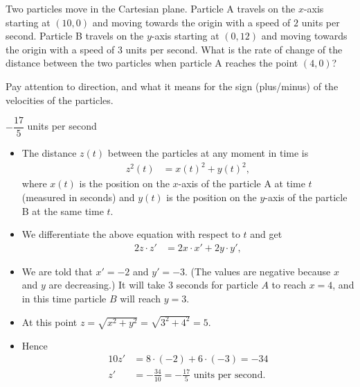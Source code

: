 
\begin{question}[2015Q]\label{s3.2Pythagorusfirst}
Two particles move in the Cartesian plane. Particle A travels on the $x$-axis
starting at  $(10,0)$ and moving towards the origin with a speed of $2$ units
per second. Particle B travels on the $y$-axis starting at $(0,12)$ and moving
towards the origin with a speed of $3$ units per second. What is the rate of
change of the distance between the two particles when particle A reaches the
point $(4,0)$?
\end{question}
\begin{hint} Pay attention to direction, and what it means for the sign (plus/minus) of the velocities of the particles.
\end{hint}
\begin{answer}
$-\dfrac{17}{5}$ units per second
\end{answer}
\begin{solution}
\begin{itemize}
 \item The distance $z(t)$ between the particles at any moment in time is
\begin{align*}
z^2(t)&= x(t)^2+y(t)^2,
\end{align*}
where $x(t)$ is the position on the $x$-axis of the particle A at time $t$
(measured in seconds) and $y(t)$ is the position on the $y$-axis of the particle
B at the same time $t$.
\item We differentiate the above equation with respect to $t$ and get
\begin{align*}
2z \cdot z' &= 2x \cdot x' + 2 y \cdot y',
\end{align*}
\item We are told that $x'=-2$ and $y'=-3$. (The values are negative because $x$ and $y$ are decreasing.) It will take $3$ seconds
for particle $A$ to reach $x=4$, and in this time particle $B$ will reach
$y=3$.

\item At this point $z = \sqrt{x^2+y^2}=\sqrt{3^2+4^2}=5$.
\item Hence
\begin{align*}
  10z' &= 8\cdot(-2)+6\cdot(-3) = -34 \\
  z' &= -\frac{34}{10} = -\frac{17}{5} \text{ units per second}.
\end{align*}
\end{itemize}
\end{solution}



